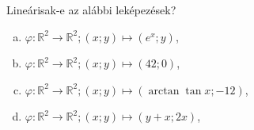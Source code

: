 \documentclass[exercise]{math-standalone}
\begin{document}
\begin{exercise}{Lineárisak-e az alábbi leképezések?}
  \begin{enumerate}[a)]
    \item \(
          \varphi: \mathbb R^2 \rightarrow \mathbb R^2;
          (x; y) \mapsto (e^x; y)
          \),
    \item \(
          \varphi: \mathbb R^2 \rightarrow \mathbb R^2;
          (x; y) \mapsto (42; 0)
          \),
    \item \(
          \varphi: \mathbb R^2 \rightarrow \mathbb R^2;
          (x; y) \mapsto (\arctan \tan x; -12)
          \),
    \item \(
          \varphi: \mathbb R^2 \rightarrow \mathbb R^2;
          (x; y) \mapsto (y + x; 2x)
          \),
  \end{enumerate}


\end{exercise}
\end{document}
